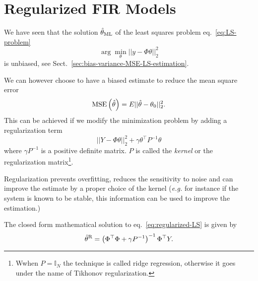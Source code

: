 \chapter{Regularized FIR Models}
\label{chap:regularised-FIR-models}

We have seen that the solution $\hat{\theta}_\textrm{ML}$ of the least squares problem eq.~\eqref{eq:LS-problem}
\begin{equation*}
  \arg\min_\theta ||y-\Phi \theta||_2^2
\end{equation*}
is unbiased, see Sect.~\ref{sec:bias-variance-MSE-LS-estimation}.

We can however choose to have a biased estimate to reduce the mean square error
\begin{equation*}
  \textrm{MSE}\left(\hat{\theta}\right) = E{||\hat{\theta}-\theta_0||_2^2}.
\end{equation*}
This can be achieved if we modify the minimization problem by adding a regularization term
\begin{equation}
  \label{eq:regularized-LS}
  ||Y-\Phi \theta||_2^2 + \gamma \theta^\top P^{-1}\theta
\end{equation}
where $\gamma P^{-1}$ is a positive definite matrix. $P$ is called the \emph{kernel} or the regularization matrix\footnote{Wwhen $P=\mathbb{I}_N$ the technique is called ridge regression, otherwise it goes under the name of Tikhonov regularization.}.

Regularization prevents overfitting, reduces the sensitivity to noise and can improve the estimate by a proper choice of the kernel (\textit{e.g.} for instance if the system is known to be stable, this information can be used to improve the estimation.)


The closed form mathematical solution to eq.~\eqref{eq:regularized-LS} is given by
\begin{equation}
  \label{eq:regularized-LS-solution}
  \hat{\theta}^\textrm{R} = \left(\Phi^\top\Phi + \gamma P^{-1}\right)^{-1}\Phi^\top Y.
\end{equation}

